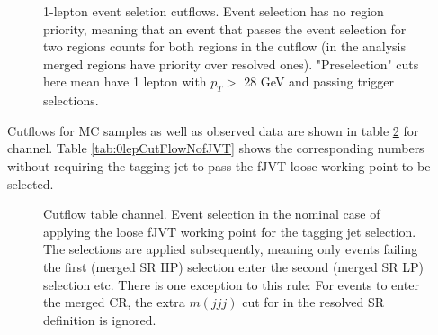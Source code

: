\begin{figure}[ht]
	\centering
	\subfigure[SR Resolved]{\resizebox{\textwidth}{!}{}}
	\caption{1-lepton event seletion cutflows. Event selection has no region priority, meaning that an event that passes the event selection for two regions counts for both regions in the cutflow (in the analysis merged regions have priority over resolved ones). "Preselection" cuts here mean have 1 lepton with $p_T >$ 28 GeV and passing trigger selections.}
    \label{fig:1lepCutFlow}
\end{figure}




Cutflows for MC samples as well as observed data are shown in table \ref{tab:0lepCutFlow} for \zlep channel. Table \ref{tab:0lepCutFlowNofJVT} shows the corresponding numbers without requiring the tagging jet to pass the fJVT loose working point to be selected.

\begin{figure}[ht]
        \centering
        \subfigure[merged SR HP]{\scalebox{.5}{}}
        \subfigure[merged SR LP]{\scalebox{.5}{}}
        \subfigure[resolved SR]{\scalebox{.5}{}}
        \subfigure[merged CR]{\scalebox{.5}{}}
        \subfigure[resolved CR]{\scalebox{.5}{}}
        \caption{Cutflow table \zlep channel. Event selection in the nominal case of applying the loose fJVT working point for the tagging jet selection. The selections are applied subsequently, meaning only events failing the first (merged SR HP) selection enter the second (merged SR LP) selection etc. There is one exception to this rule: For events to enter the merged CR, the extra $m(jjj)$ cut for in the resolved SR definition is ignored. }
    \label{tab:0lepCutFlow}
\end{figure}

